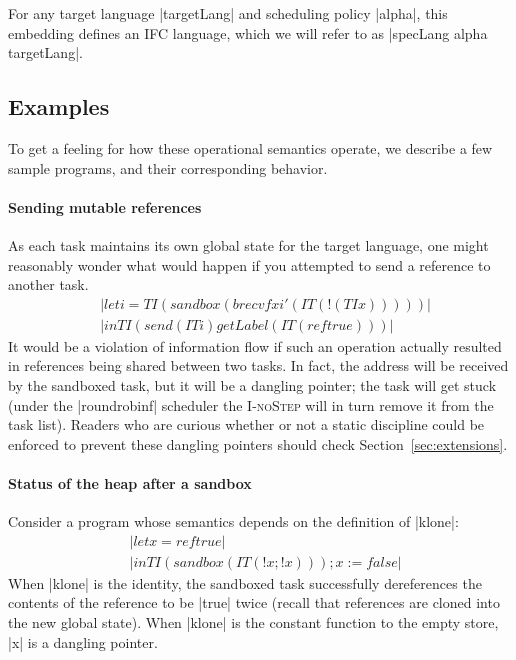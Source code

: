 For any target language |targetLang| and scheduling policy |alpha|, this
embedding defines an IFC language, which we will
refer to as |specLang alpha targetLang|.

\subsection{Examples}

To get a feeling for how these operational semantics operate, we
describe a few sample programs, and their corresponding behavior.

\paragraph{Sending mutable references}  As each task maintains its own
global state for the target language, one might reasonably wonder what would
happen if you attempted to send a reference to another task.
\begin{align*}
    & |let i = TI (sandbox (brecvf x i' (IT (!(TI x)))))|\\
    & |in TI (send (IT i) getLabel (IT (ref true)))|
\end{align*}
It would be a violation of information flow if such an operation actually
resulted in references being shared between two tasks.  In fact, the address
will be received by the sandboxed task, but it will be a dangling pointer; the
task will get stuck (under the |roundrobinf| scheduler the \textsc{I-noStep} will in turn remove it from the task list).  Readers
who are curious whether or not a static discipline could be enforced to
prevent these dangling pointers should check Section~\ref{sec:extensions}.

\paragraph{Status of the heap after a sandbox}  Consider a program whose
semantics depends on the definition of |klone|:
\begin{align*}
    & |let x = ref true| \\
    & |in TI (sandbox (IT (!x; !x))); x := false|
\end{align*}
When |klone| is the identity, the sandboxed task successfully dereferences
the contents of the reference to be |true| twice (recall that references
are cloned into the new global state).  When |klone| is the constant function
to the empty store, |x| is a dangling pointer.

